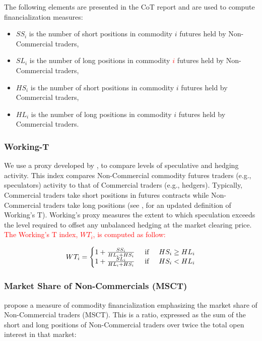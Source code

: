 \documentclass[12pt]{article}
\begin{document}
The following elements are presented in the CoT report and are used to compute financialization measures:

\begin{itemize}
\item $SS_i$ is the number of short positions in commodity $i$ futures held by Non-Commercial traders,
\item $SL_i$  is the number of long positions in commodity \textcolor{red}{$i$} futures held by Non-Commercial traders,
\item $HS_i$ is the number of short positions in commodity $i$ futures held by Commercial traders, 
\item $HL_i$ is the number of long positions in commodity $i$ futures held by Commercial traders.
\end{itemize}

\subsubsection{Working-T}
We use a proxy developed by \citet{working1960speculation}, to compare levels of speculative and hedging activity. This index compares Non-Commercial commodity futures traders (e.g., speculators) activity to that of Commercial traders (e.g., hedgers). Typically, Commercial traders take short positions in futures contracts while Non-Commercial traders take long positions (see \citet{shanker2017new}, for an updated definition of Working’s T). Working’s proxy measures the extent to which speculation exceeds the level required to offset any unbalanced hedging at the market clearing price.  \textcolor{red}{The Working's T index, $WT_i$, is computed as follow:}


\begin{equation} \label{eqn:Working}
WT_i=\left\{\begin{matrix}
 1+\frac{SS_i}{HL_i+HS_i} \hspace{0.5cm} \mbox{if} \hspace{0.5cm} HS_i \ge HL_i\\
1+\frac{SL_i}{HL_i+HS_i} \hspace{0.5cm} \mbox{if} \hspace{0.5cm} HS_i < HL_i
\end{matrix}\right.
\end{equation}


\subsubsection{Market Share of Non-Commercials (MSCT)}
\citet{buyukcsahin2014speculators} propose a measure of commodity financialization emphasizing the market share of Non-Commercial traders (MSCT). This  is a ratio, expressed as  the sum of the short and long positions of Non-Commercial traders over twice the total open interest in that market: 
\end{document}
